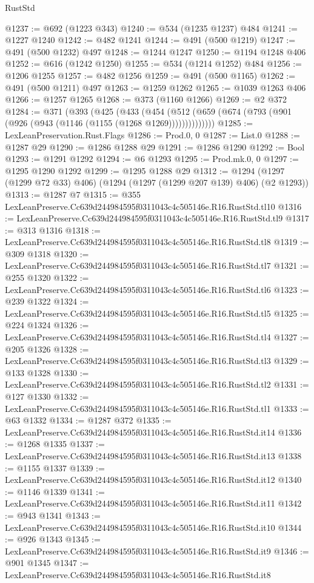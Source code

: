 \begin{lexlean}{RustStd}
\begin{coremodule}
@1237 := @692 (@1223 @343)
@1240 := @534 (@1235 @1237) @484
@1241 := @1227 @1240
@1242 := @482 @1241
@1244 := @491 (@500 @1219)
@1247 := @491 (@500 @1232) @497
@1248 := @1244 @1247
@1250 := @1194 @1248 @406
@1252 := @616 (@1242 @1250)
@1255 := @534 (@1214 @1252) @484
@1256 := @1206 @1255
@1257 := @482 @1256
@1259 := @491 (@500 @1165)
@1262 := @491 (@500 @1211) @497
@1263 := @1259 @1262
@1265 := @1039 @1263 @406
@1266 := @1257 @1265
@1268 := @373 (@1160 @1266)
@1269 := @2 @372
@1284 := @371
    (@393
      (@425
        (@433
          (@454 (@512 (@659 (@674 (@793 (@901 (@926 (@943 (@1146 (@1155 (@1268 @1269))))))))))))))
@1285 := LexLeanPreservation.Rust.Flags
@1286 := Prod.{0, 0}
@1287 := List.{0}
@1288 := @1287 @29
@1290 := @1286 @1288 @29
@1291 := @1286 @1290
@1292 := Bool
@1293 := @1291 @1292
@1294 := @6 @1293
@1295 := Prod.mk.{0, 0}
@1297 := @1295 @1290 @1292
@1299 := @1295 @1288 @29
@1312 := @1294 (@1297 (@1299 @72 @33) @406) (@1294 (@1297 (@1299 @207 @139) @406) (@2 @1293))
@1313 := @1287 @7
@1315 := @355 LexLeanPreserve.Cc639d244984595f0311043c4c505146e.R16.RustStd.tl10
@1316 := LexLeanPreserve.Cc639d244984595f0311043c4c505146e.R16.RustStd.tl9
@1317 := @313 @1316
@1318 := LexLeanPreserve.Cc639d244984595f0311043c4c505146e.R16.RustStd.tl8
@1319 := @309 @1318
@1320 := LexLeanPreserve.Cc639d244984595f0311043c4c505146e.R16.RustStd.tl7
@1321 := @255 @1320
@1322 := LexLeanPreserve.Cc639d244984595f0311043c4c505146e.R16.RustStd.tl6
@1323 := @239 @1322
@1324 := LexLeanPreserve.Cc639d244984595f0311043c4c505146e.R16.RustStd.tl5
@1325 := @224 @1324
@1326 := LexLeanPreserve.Cc639d244984595f0311043c4c505146e.R16.RustStd.tl4
@1327 := @205 @1326
@1328 := LexLeanPreserve.Cc639d244984595f0311043c4c505146e.R16.RustStd.tl3
@1329 := @133 @1328
@1330 := LexLeanPreserve.Cc639d244984595f0311043c4c505146e.R16.RustStd.tl2
@1331 := @127 @1330
@1332 := LexLeanPreserve.Cc639d244984595f0311043c4c505146e.R16.RustStd.tl1
@1333 := @63 @1332
@1334 := @1287 @372
@1335 := LexLeanPreserve.Cc639d244984595f0311043c4c505146e.R16.RustStd.it14
@1336 := @1268 @1335
@1337 := LexLeanPreserve.Cc639d244984595f0311043c4c505146e.R16.RustStd.it13
@1338 := @1155 @1337
@1339 := LexLeanPreserve.Cc639d244984595f0311043c4c505146e.R16.RustStd.it12
@1340 := @1146 @1339
@1341 := LexLeanPreserve.Cc639d244984595f0311043c4c505146e.R16.RustStd.it11
@1342 := @943 @1341
@1343 := LexLeanPreserve.Cc639d244984595f0311043c4c505146e.R16.RustStd.it10
@1344 := @926 @1343
@1345 := LexLeanPreserve.Cc639d244984595f0311043c4c505146e.R16.RustStd.it9
@1346 := @901 @1345
@1347 := LexLeanPreserve.Cc639d244984595f0311043c4c505146e.R16.RustStd.it8

\end{coremodule}
\end{lexlean}
